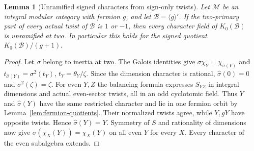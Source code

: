 \documentclass[11pt,a4paper]{article}
\numberwithin{equation}{section}
\newtheorem{lemma}[theorem]{Lemma}
\theoremstyle{remark}
\newcommand{\M}{\mathcal M}
\newcommand{\K}{K_0}
\begin{document}
\begin{lemma}[Unramified signed characters from sign-only twists]\label{lem:signed-unramified-sign-twists}
Let $\M$ be an integral modular category with fermion $g$, and let
$\mathcal B=\langle g\rangle'$. If the two-primary part of every
actual twist of $\mathcal B$ is $1$ or $-1$, then every character
field of $\K(\mathcal B)$ is unramified at two. In particular this
holds for the signed quotient $\K(\mathcal B)/(g+1)$.
\end{lemma}
\begin{proof}
Let $\sigma$ belong to inertia at two. The Galois identities
\cite[Theorem~II]{DLNCongruence} give
$\sigma\chi_Y=\chi_{\widehat\sigma(Y)}$ and
$t_{\widehat\sigma(Y)}=\sigma^2(t_Y)$, $t_Y=\theta_Y/\zeta$.
Since the dimension character is rational, $\widehat\sigma(0)=0$
and $\sigma^2(\zeta)=\zeta$. For even $Y,Z$ the balancing formula
expresses $S_{YZ}$ in integral dimensions and actual even-sector
twists, all in an odd cyclotomic field. Thus $Y$ and
$\widehat\sigma(Y)$ have the same restricted character and lie
in one fermion orbit by Lemma~\ref{lem:fermion-quotients}.
Their normalized twists agree, while $Y,gY$ have opposite twists.
Hence $\widehat\sigma(Y)=Y$. Symmetry of $S$ and rationality of
dimensions now give $\sigma(\chi_X(Y))=\chi_X(Y)$ on all even $Y$
for every $X$. Every character of the even subalgebra extends.
\end{proof}
\end{document}
